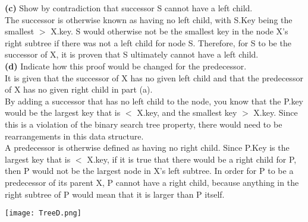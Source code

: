 \documentclass[12pt]{article}
\begin{document}
\linebreak
\textbf{(c)} Show by contradiction that successor S cannot have a left child. \\
\linebreak
The successor is otherwise known as having no left child, with S.Key being the smallest $>$ X.key.  S would otherwise not be the smallest key in the node X's right subtree if there was not a left child for node S.  Therefore, for S to be the successor of X, it is proven that S ultimately cannot have a left child. \\
\linebreak
\textbf{(d)} Indicate how this proof would be changed for the predecessor. \\
\linebreak
It is given that the successor of X has no given left child and that the predecessor of X has no given right child in part (a).  \\
\linebreak
By adding a successor that has no left child to the node, you know that the P.key would be the largest key that is $<$ X.key, and the smallest key $>$ X.key. Since this is a violation of the binary search tree property, there would need to be rearrangements in this data structure. \\
\linebreak
A predecessor is otherwise defined as having no right child. Since P.Key is the largest key that is $<$ X.key,  if it is true that there would be a right child for P, then P would not be the largest node in X's left subtree.  In order for P to be a predecessor of its parent X, P cannot have a right child, because anything in the right subtree of P would mean that it is larger than P itself. \\
\begin{center}
\texttt{[image: TreeD.png]}\\
\end{center}
\linebreak
\end{document}
